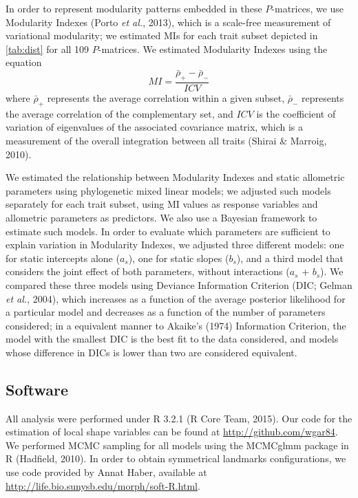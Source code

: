 \documentclass[12pt,]{article}
\begin{document}
In order to represent modularity patterns embedded in these
$P$-matrices, we use Modularity Indexes (Porto \emph{et al.}, 2013),
which is a scale-free measurement of variational modularity; we
estimated MIs for each trait subset depicted in \autoref{tab:dist} for
all 109 $P$-matrices. We estimated Modularity Indexes using the equation
\[
MI = \frac {\bar{\rho}_{+} - \bar{\rho}_{-}} {ICV}
\] where $\bar{\rho}_{+}$ represents the average correlation within a
given subset, $\bar{\rho}_{-}$ represents the average correlation of the
complementary set, and $ICV$ is the coefficient of variation of
eigenvalues of the associated covariance matrix, which is a measurement
of the overall integration between all traits (Shirai \& Marroig, 2010).

We estimated the relationship between Modularity Indexes and static
allometric parameters using phylogenetic mixed linear models; we
adjusted such models separately for each trait subset, using MI values
as response variables and allometric parameters as predictors. We also
use a Bayesian framework to estimate such models. In order to evaluate
which parameters are sufficient to explain variation in Modularity
Indexes, we adjusted three different models: one for static intercepts
alone ($a_s$), one for static slopes ($b_s$), and a third model that
considers the joint effect of both parameters, without interactions
($a_s$ + $b_s$). We compared these three models using Deviance
Information Criterion (DIC; Gelman \emph{et al.}, 2004), which increases
as a function of the average posterior likelihood for a particular model
and decreases as a function of the number of parameters considered; in a
equivalent manner to Akaike's (1974) Information Criterion, the model
with the smallest DIC is the best fit to the data considered, and models
whose difference in DICs is lower than two are considered equivalent.

\subsection{Software}\label{software}

All analysis were performed under R 3.2.1 (R Core Team, 2015). Our code
for the estimation of local shape variables can be found at
\url{http://github.com/wgar84}. We performed MCMC sampling for all
models using the MCMCglmm package in R (Hadfield, 2010). In order to
obtain symmetrical landmarks configurations, we use code provided by
Annat Haber, available at
\url{http://life.bio.sunysb.edu/morph/soft-R.html}.
\end{document}
